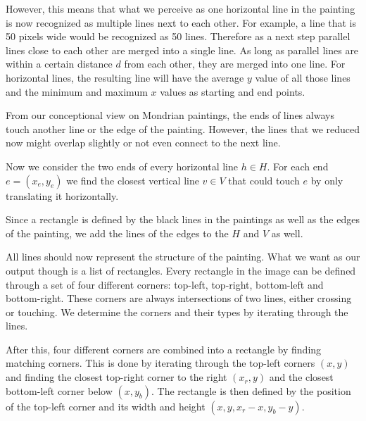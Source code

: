 \documentclass[serif,article,noparskip]{agse-thesis}
\begin{document}

However, this means that what we perceive as one horizontal line in the painting
is now recognized as multiple lines next to each other. For example, a line that
is 50 pixels wide would be recognized as 50 lines. Therefore as a next step
parallel lines close to each other are merged into a single line. As long as
parallel lines are within a certain distance $d$ from each other, they are merged
into one line. For horizontal lines, the resulting line will have the average
$y$ value of all those lines and the minimum and maximum $x$ values as starting
and end points.

From our conceptional view on Mondrian paintings, the ends of lines always touch
another line or the edge of the painting. However, the lines that we reduced now
might overlap slightly or not even connect to the next line.

Now we consider the two ends of every horizontal line $h \in H$. For each end $e =
(x_e,y_e)$ we find the closest vertical line $v \in V$ that could touch $e$ by only
translating it horizontally.

Since a rectangle is defined by the black lines in the paintings as well as the
edges of the painting, we add the lines of the edges to the $H$ and $V$ as well.


All lines should now represent the structure of the painting. What we want as
our output though is a list of rectangles. Every rectangle in the image can be
defined through a set of four different corners: top-left, top-right,
bottom-left and bottom-right. These corners are always intersections of two
lines, either crossing or touching. We determine the corners and their types by
iterating through the lines.

After this, four different corners are combined into a rectangle by finding
matching corners. This is done by iterating through the top-left corners $(x,y)$
and finding the closest top-right corner to the right $(x_r, y)$ and the
closest bottom-left corner below $(x, y_b)$. The rectangle is then defined by
the position of the top-left corner and its width and height
$(x,y,x_r-x,y_b-y)$.
\end{document}
